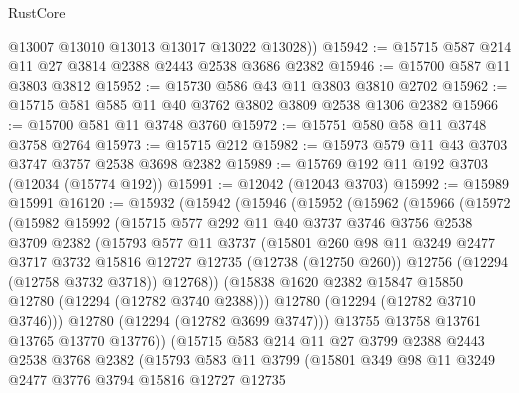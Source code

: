 \begin{lexlean}{RustCore}
\begin{coremodule}
        @13007
        @13010
        @13013
        @13017
        @13022
        @13028))
@15942 := @15715 @587 @214 @11 @27 @3814 @2388 @2443 @2538 @3686 @2382
@15946 := @15700 @587 @11 @3803 @3812
@15952 := @15730 @586 @43 @11 @3803 @3810 @2702
@15962 := @15715 @581 @585 @11 @40 @3762 @3802 @3809 @2538 @1306 @2382
@15966 := @15700 @581 @11 @3748 @3760
@15972 := @15751 @580 @58 @11 @3748 @3758 @2764
@15973 := @15715 @212
@15982 := @15973 @579 @11 @43 @3703 @3747 @3757 @2538 @3698 @2382
@15989 := @15769 @192 @11 @192 @3703 (@12034 (@15774 @192))
@15991 := @12042 (@12043 @3703)
@15992 := @15989 @15991
@16120 := @15932
    (@15942
      (@15946
        (@15952
          (@15962
            (@15966
              (@15972
                (@15982
                  @15992
                  (@15715
                    @577
                    @292
                    @11
                    @40
                    @3737
                    @3746
                    @3756
                    @2538
                    @3709
                    @2382
                    (@15793
                      @577
                      @11
                      @3737
                      (@15801
                        @260
                        @98
                        @11
                        @3249
                        @2477
                        @3717
                        @3732
                        @15816
                        @12727
                        @12735
                        (@12738 (@12750 @260))
                        @12756
                        (@12294 (@12758 @3732 @3718))
                        @12768))
                    (@15838 @1620 @2382 @15847 @15850 @12780 (@12294 (@12782 @3740 @2388)))
                    @12780
                    (@12294 (@12782 @3710 @3746)))
                  @12780
                  (@12294 (@12782 @3699 @3747)))
                @13755
                @13758
                @13761
                @13765
                @13770
                @13776))
            (@15715
              @583
              @214
              @11
              @27
              @3799
              @2388
              @2443
              @2538
              @3768
              @2382
              (@15793
                @583
                @11
                @3799
                (@15801
                  @349
                  @98
                  @11
                  @3249
                  @2477
                  @3776
                  @3794
                  @15816
                  @12727
                  @12735

\end{coremodule}
\end{lexlean}
